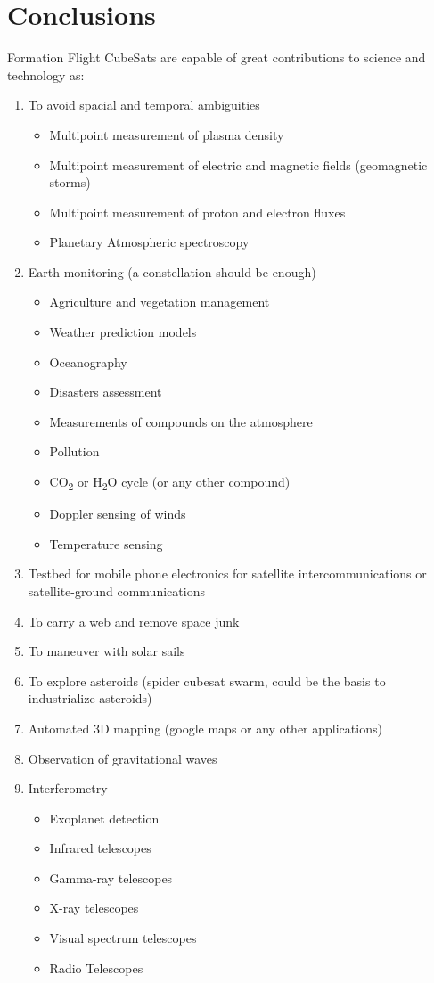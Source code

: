 \section{Conclusions}
Formation Flight CubeSats are capable of great contributions to science
and technology as:
\begin{enumerate}
\item To avoid spacial and temporal ambiguities

\begin{itemize}
\item Multipoint measurement of plasma density
\item Multipoint measurement of electric and magnetic fields (geomagnetic storms)
\item Multipoint measurement of proton and electron fluxes
\item Planetary Atmospheric spectroscopy
\end{itemize}
\item Earth monitoring (a constellation should be enough)

\begin{itemize}
\item Agriculture and vegetation management
\item Weather prediction models
\item Oceanography
\item Disasters assessment
\item Measurements of compounds on the atmosphere
\item Pollution
\item CO\textsubscript{2} or H\textsubscript{2}O cycle (or any other compound)
\item Doppler sensing of winds
\item Temperature sensing
\end{itemize}
\item Testbed for mobile phone electronics for satellite intercommunications
or satellite-ground communications
\item To carry a web and remove space junk
\item To maneuver with solar sails
\item To explore asteroids (spider cubesat swarm, could be the basis to
industrialize asteroids)
\item Automated 3D mapping (google maps or any other applications)
\item Observation of gravitational waves
\item Interferometry

\begin{itemize}
\item Exoplanet detection
\item Infrared telescopes
\item Gamma-ray telescopes
\item X-ray telescopes
\item Visual spectrum telescopes
\item Radio Telescopes
\end{itemize}
\end{enumerate}